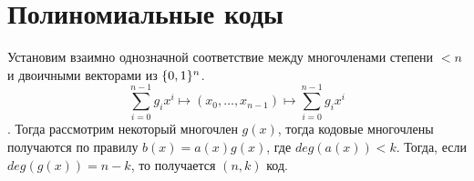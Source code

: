 \section{Полиномиальные коды}

\begin{definition}
Установим взаимно однозначной соответствие между многочленами степени 
$< n$ и двоичными векторами из $\{0,1\}^n$. 
$$\sum\limits_{i=0}^{n-1} g_i x^i \mapsto (x_0, \ldots, x_{n-1})
 \mapsto \sum\limits_{i=0}^{n-1} g_i x^i$$.
Тогда рассмотрим некоторый многочлен $g(x)$, тогда кодовые многочлены
получаются по правилу $b(x) = a(x) g(x)$, где $deg(a(x)) < k$. Тогда,
если $deg(g(x)) = n-k$, то получается $(n,k)$ код.
\end{definition}


